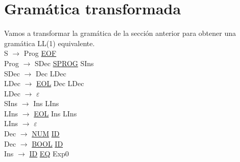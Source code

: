 \documentclass[\main/MemoriaPL.tex]{subfiles}
\begin{document}
  \section{Gramática transformada}
    \par
    Vamos a transformar la gramática de la sección anterior para obtener una gramática LL(1)
    equivalente.\\
    \vspace{2mm}
    S $\rightarrow$ Prog \underline{EOF}\\
    Prog $\rightarrow$ SDec \underline{SPROG} SIns\\
    SDec $\rightarrow$ Dec LDec\\
    LDec $\rightarrow$ \underline{EOL} Dec LDec\\
    LDec $\rightarrow$ $\varepsilon$\\
    SIns $\rightarrow$ Ins LIns\\
    LIns $\rightarrow$ \underline{EOL} Ins LIns\\
    LIns $\rightarrow$ $\varepsilon$\\
    Dec $\rightarrow$ \underline{NUM} \underline{ID}\\
    Dec $\rightarrow$ \underline{BOOL} \underline{ID}\\
    Ins $\rightarrow$ \underline{ID} \underline{EQ} Exp0\\
    \vspace{2mm}
\end{document}
